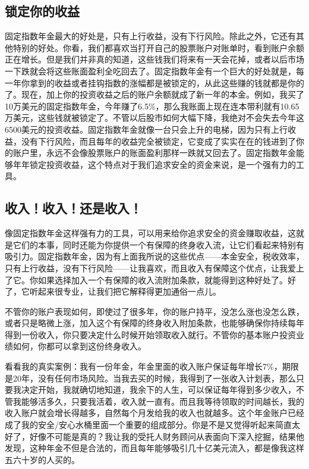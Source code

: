 \subsection{锁定你的收益}

固定指数年金最大的好处是，只有上行收益，没有下行风险。除此之外，它还有其他特别的好处。你看，我们都喜欢当打开自己的股票账户对账单时，看到账户余额正在增长。但是我们并非真的知道，这些钱我们将来有一天会花掉，或者以后市场一下跌就会将这些账面盈利全吃回去了。固定指数年金有一个巨大的好处就是，每一年你拿到的收益或者挂钩指数的涨幅都是被锁定的，从此这些赚的钱就都是你的了。现在，加上你的投资收益之后的账户余额就成了新一年的本金。例如，我买了10万美元的固定指数年金，今年赚了6.5\%，那么我账面上现在连本带利就有10.65万美元，这些钱就被锁定了。不管以后股市如何大幅下降，我绝对不会失去今年这6500美元的投资收益。固定指数年金就像一台只会上升的电梯，因为只有上行收益，没有下行风险，而且每年的收益完全被锁定，它变成了实实在在的钱进到了你的账户里，永远不会像股票账户的账面盈利那样一跌就又回去了。固定指数年金能够年年锁定投资收益，这个特点对于我们追求安全的资金来说，是一个强有力的工具。

\subsection{收入！收入！还是收入！}

像固定指数年金这样强有力的工具，可以用来给你追求安全的资金赚取收益，这就是它们的本事，同时还能为你提供一个有保障的终身收入流，让它们看起来特别有吸引力。固定指数年金，因为有上面我所说的这些优点——本金安全，税收效率，只有上行收益，没有下行风险——让我喜欢，而且收入有保障这个优点，让我爱上了它。你如果选择加入一个有保障的收入流附加条款，就能得到这种好处了。好了，它听起来很专业，让我们把它解释得更加通俗一点儿。

不管你的账户表现如何，即使过了很多年，你的账户持平，没怎么涨也没怎么跌，或者只是略微上涨，加入这个有保障的终身收入附加条款，也能够确保你持续每年得到一份收入，你只要决定什么时候开始领取收入就行。不管你的基本账户投资业绩如何，你都可以拿到这份终身收入。

看看我的真实案例：我有一份年金，年金里面的收入账户保证每年增长7\%，期限是20年，没有任何市场风险。当我去买的时候，我得到了一张收入计划表，那么只要我决定开始，我就确切地知道，我余下的人生，可以保证每年得到多少收入，不管我能够活多久，只要我活着，收入就一直有。而且我等待领取的时间越长，我的收入账户就会增长得越多，自然每个月发给我的收入也就越多。这个年金账户已经成了我的安全/安心水桶里面一个重要的组成部分。你是不是又觉得听起来简直太好了，好像不可能是真的？我让我的受托人财务顾问从表面向下深入挖掘，结果他发现，这种年金不但是合法的，而且每年能够吸引几十亿美元流入，都是像我这样五六十岁的人买的。

